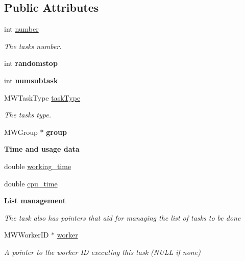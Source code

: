 \subsection*{Public Attributes}
\begin{DoxyCompactItemize}
\item 
\mbox{\label{classMWTask_ad133dd1be9c974871a1564e78eed8715}} 
int \hyperlink{classMWTask_ad133dd1be9c974871a1564e78eed8715}{number}
\begin{DoxyCompactList}\small\item\em The task\textquotesingle{}s number. \end{DoxyCompactList}\item 
\mbox{\label{classMWTask_a08c4ddb0a71742a0ea3bc8150dd1357f}} 
int {\bfseries randomstop}
\item 
\mbox{\label{classMWTask_a0499119e0f62a505c1ab2b3dacda4030}} 
int {\bfseries numsubtask}
\item 
\mbox{\label{classMWTask_a3899784f624c803ae211ab781f180ca3}} 
M\+W\+Task\+Type \hyperlink{classMWTask_a3899784f624c803ae211ab781f180ca3}{task\+Type}
\begin{DoxyCompactList}\small\item\em The task\textquotesingle{}s type. \end{DoxyCompactList}\item 
\mbox{\label{classMWTask_ae6405101d8bb9711116f5907864a99ef}} 
M\+W\+Group $\ast$ {\bfseries group}
\end{DoxyCompactItemize}
\begin{Indent}\textbf{ Time and usage data}\par
\begin{DoxyCompactItemize}
\item 
double \hyperlink{classMWTask_ae503d6480ef81dcc1ccd7927e4655226}{working\+\_\+time}
\item 
double \hyperlink{classMWTask_a5f954bdae3d554327beab944c8e51125}{cpu\+\_\+time}
\end{DoxyCompactItemize}
\end{Indent}
\begin{Indent}\textbf{ List management}\par
{\em The task also has pointers that aid for managing the list of tasks to be done }\begin{DoxyCompactItemize}
\item 
\mbox{\label{classMWTask_ab7fc4bb108116fe6f5b33b818e6a8650}} 
M\+W\+Worker\+ID $\ast$ \hyperlink{classMWTask_ab7fc4bb108116fe6f5b33b818e6a8650}{worker}
\begin{DoxyCompactList}\small\item\em A pointer to the worker ID executing this task (N\+U\+LL if none) \end{DoxyCompactList}\end{DoxyCompactItemize}
\end{Indent}
